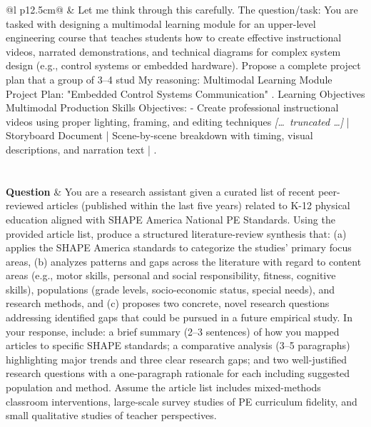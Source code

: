 \begin{longtable}{@{}l p{12.5cm}@{}}
  & Let me think through this carefully. \newline The question/task: You are tasked with designing a multimodal learning module for an upper-level engineering course that teaches students how to create effective instructional videos, narrated demonstrations, and technical diagrams for complex system design (e.g., control systems or embedded hardware). Propose a complete project plan that a group of 3--4 stud \newline My reasoning: Multimodal Learning Module Project Plan: "Embedded Control Systems Communication" . Learning Objectives \newline Multimodal Production Skills Objectives: \newline - Create professional instructional videos using proper lighting, framing, and editing techniques \newline \textit{[\ldots\ truncated \ldots]} \newline | Storyboard Document | Scene-by-scene breakdown with timing, visual descriptions, and narration text | . \\
  \specialrule{1.2pt}{8pt}{8pt}
   \\
  \midrule
   \\
  \textbf{Question} & You are a research assistant given a curated list of recent peer-reviewed articles (published within the last five years) related to K-12 physical education aligned with SHAPE America National PE Standards. Using the provided article list, produce a structured literature-review synthesis that: (a) applies the SHAPE America standards to categorize the studies' primary focus areas, (b) analyzes patterns and gaps across the literature with regard to content areas (e.g., motor skills, personal and social responsibility, fitness, cognitive skills), populations (grade levels, socio-economic status, special needs), and research methods, and (c) proposes two concrete, novel research questions addressing identified gaps that could be pursued in a future empirical study. In your response, include: a brief summary (2--3 sentences) of how you mapped articles to specific SHAPE standards; a comparative analysis (3--5 paragraphs) highlighting major trends and three clear research gaps; and two well-justified research questions with a one-paragraph rationale for each including suggested population and method. Assume the article list includes mixed-methods classroom interventions, large-scale survey studies of PE curriculum fidelity, and small qualitative studies of teacher perspectives. \\

\end{longtable}
